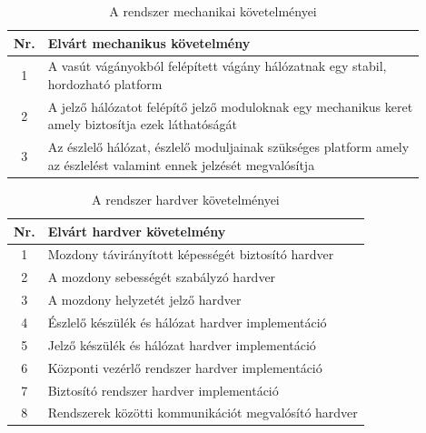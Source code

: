 \documentclass[a4paper,12pt]{article}
\begin{document}
\begin{table}[!htbp]
    \centering
    \begin{tabular}{|c|m{12cm}|} \hline
        Nr. & Elvárt mechanikus követelmény\\ \hline
        1 & \specialcell{A vasút vágányokból felépített vágány hálózatnak egy stabil, \\hordozható platform} \\ \hline
        2 & \specialcell{A jelző hálózatot felépítő jelző moduloknak egy mechanikus keret \\ amely biztosítja ezek láthatóságát} \\ \hline
        3 & \specialcell{Az észlelő hálózat, észlelő moduljainak szükséges platform amely \\ az észlelést valamint ennek jelzését megvalósítja} \\ \hline
    \end{tabular}
    \caption[Mechanikai követelmény]{A rendszer mechanikai követelményei}
    \label{tab:mechrequirment}
\end{table}

\begin{table}[!htbp]
    \centering
    \begin{tabular}{|c|m{12cm}|} \hline
        Nr. & Elvárt hardver követelmény\\ \hline
        1 & Mozdony távirányított képességét biztosító hardver \\ \hline
        2 & A mozdony sebességét szabályzó hardver \\ \hline
        3 & A mozdony helyzetét jelző hardver \\ \hline
		4 & Észlelő készülék és hálózat hardver implementáció \\ \hline
		5 & Jelző készülék és hálózat hardver implementáció \\ \hline
		6 & Központi vezérlő rendszer hardver implementáció \\ \hline
		7 & Biztosító rendszer hardver implementáció \\ \hline
		8 & Rendszerek közötti kommunikációt megvalósító hardver\\ \hline
    \end{tabular}
    \caption[Hardver követelmény]{A rendszer hardver követelményei}
    \label{tab:hardrequirment}
\end{table}
\end{document}
